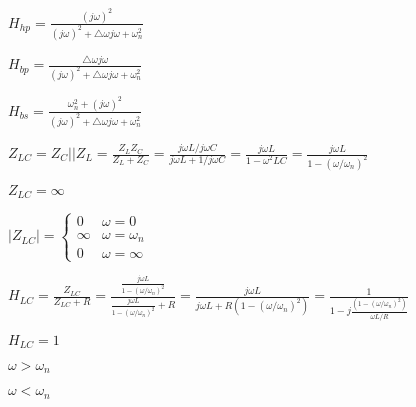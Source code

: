 \documentclass{article}
\def\lthtmlcheckvsize{\ifdim\ht\sizebox<\vsize 
  \ifdim\wd\sizebox<\hsize\expandafter\hfill\fi \expandafter\vfill
  \else\expandafter\vss\fi}%
\begin{document}
{\newpage\clearpage
{}%
$\displaystyle H_{hp}=\frac{(j\omega)^2}{(j\omega)^2+\triangle \omega j\omega+\omega_n^2}$%
\lthtmlindisplaymathZ
\lthtmlcheckvsize\clearpage}

{\newpage\clearpage
{}%
$\displaystyle H_{bp}=\frac{\triangle\omega j\omega}{(j\omega)^2+\triangle \omega j\omega+\omega_n^2}$%
\lthtmlindisplaymathZ
\lthtmlcheckvsize\clearpage}

{\newpage\clearpage
{}%
$\displaystyle H_{bs}=\frac{\omega_n^2+(j\omega)^2}{(j\omega)^2+\triangle \omega j\omega+\omega_n^2}$%
\lthtmlindisplaymathZ
\lthtmlcheckvsize\clearpage}

{\newpage\clearpage
{}%
$\displaystyle Z_{LC}=Z_C||Z_L=\frac{Z_LZ_C}{Z_L+Z_C}
=\frac{j\omega L/j\omega C}{j\omega L+1/j\omega C}
=\frac{j\omega L}{1-\omega^2 LC}
=\frac{j\omega L}{1-(\omega/\omega_n)^2 }$%
\lthtmlindisplaymathZ
\lthtmlcheckvsize\clearpage}

{\newpage\clearpage
{}%
$ Z_{LC}=\infty$%
\lthtmlindisplaymathZ
\lthtmlcheckvsize\clearpage}

{\newpage\clearpage
{}%
$\displaystyle |Z_{LC}|=\left\{\begin{array}{cc}0 & \omega=0\\\infty & \omega=\omega_n\\
0 & \omega=\infty\end{array}\right.$%
\lthtmlindisplaymathZ
\lthtmlcheckvsize\clearpage}

{\newpage\clearpage
{}%
$\displaystyle H_{LC}=\frac{Z_{LC}}{Z_{LC}+R}=\frac{\frac{j\omega L}{1-(\omega/\omega_n)^2}}{
\frac{j\omega L}{1-(\omega/\omega_n)^2 } +R}
=\frac{j\omega L}{j\omega L+R(1-(\omega/\omega_n)^2)}
=\frac{1}{1-j\frac{(1-(\omega/\omega_n)^2)}{\omega L/R}}$%
\lthtmlindisplaymathZ
\lthtmlcheckvsize\clearpage}

{\newpage\clearpage
{}%
$ H_{LC}=1$%
\lthtmlindisplaymathZ
\lthtmlcheckvsize\clearpage}

{\newpage\clearpage
{}%
$ \omega>\omega_n$%
\lthtmlindisplaymathZ
\lthtmlcheckvsize\clearpage}

{\newpage\clearpage
{}%
$ \omega<\omega_n$%
\lthtmlindisplaymathZ
\lthtmlcheckvsize\clearpage}
\end{document}
